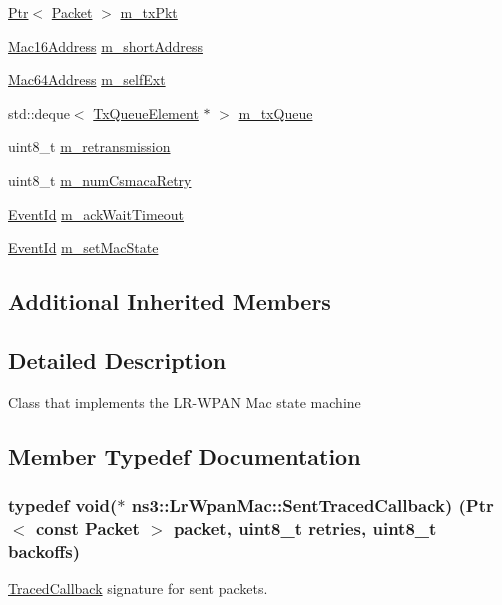 \begin{DoxyCompactItemize}
\item 
\hyperlink{classns3_1_1Ptr}{Ptr}$<$ \hyperlink{classns3_1_1Packet}{Packet} $>$ \hyperlink{classns3_1_1LrWpanMac_aca93e7c7a2128818f2861a48751442ca}{m\+\_\+tx\+Pkt}
\item 
\hyperlink{classns3_1_1Mac16Address}{Mac16\+Address} \hyperlink{classns3_1_1LrWpanMac_a6886e840ca3a1986b93db966c58ed415}{m\+\_\+short\+Address}
\item 
\hyperlink{classns3_1_1Mac64Address}{Mac64\+Address} \hyperlink{classns3_1_1LrWpanMac_ad519d2851f7d2e15c5cbc8c9bdee3f97}{m\+\_\+self\+Ext}
\item 
std\+::deque$<$ \hyperlink{structns3_1_1LrWpanMac_1_1TxQueueElement}{Tx\+Queue\+Element} $\ast$ $>$ \hyperlink{classns3_1_1LrWpanMac_a90ea1fb2b1cec84e8ca2177772a1644d}{m\+\_\+tx\+Queue}
\item 
uint8\+\_\+t \hyperlink{classns3_1_1LrWpanMac_afa6dceab5f0fec699c907ea8c61ffa39}{m\+\_\+retransmission}
\item 
uint8\+\_\+t \hyperlink{classns3_1_1LrWpanMac_a1859006076f65683c1fa442375d706a6}{m\+\_\+num\+Csmaca\+Retry}
\item 
\hyperlink{classns3_1_1EventId}{Event\+Id} \hyperlink{classns3_1_1LrWpanMac_aab5862bb53367634f12d0cddecc19fa8}{m\+\_\+ack\+Wait\+Timeout}
\item 
\hyperlink{classns3_1_1EventId}{Event\+Id} \hyperlink{classns3_1_1LrWpanMac_a764e1cada16e9fc51d9863963d962823}{m\+\_\+set\+Mac\+State}
\end{DoxyCompactItemize}
\subsection*{Additional Inherited Members}


\subsection{Detailed Description}
Class that implements the L\+R-\/\+W\+P\+AN Mac state machine 

\subsection{Member Typedef Documentation}
\subsubsection[{\texorpdfstring{Sent\+Traced\+Callback}{SentTracedCallback}}]{\setlength{\rightskip}{0pt plus 5cm}typedef void($\ast$  ns3\+::\+Lr\+Wpan\+Mac\+::\+Sent\+Traced\+Callback) ({\bf Ptr}$<$ const {\bf Packet} $>$ packet, uint8\+\_\+t retries, uint8\+\_\+t backoffs)}\hypertarget{classns3_1_1LrWpanMac_a64dc8b44e7aeb4e7c3bb9d0f71ed70e8}{}\label{classns3_1_1LrWpanMac_a64dc8b44e7aeb4e7c3bb9d0f71ed70e8}
\hyperlink{classns3_1_1TracedCallback}{Traced\+Callback} signature for sent packets.


